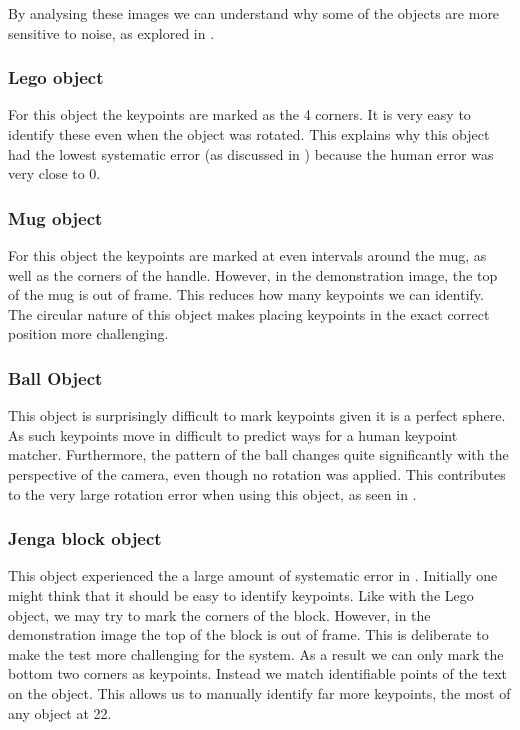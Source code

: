 By analysing these images we can understand why some of the objects are more sensitive to noise, as explored in .

\subsubsection{Lego object}
For this object the keypoints are marked as the 4 corners. It is very easy to identify these even when the object was rotated. This explains why this object had the lowest systematic error (as discussed in ) because the human error was very close to 0.

\subsubsection{Mug object}
For this object the keypoints are marked at even intervals around the mug, as well as the corners of the handle. However, in the demonstration image, the top of the mug is out of frame. This reduces how many keypoints we can identify. The circular nature of this object makes placing keypoints in the exact correct position more challenging.

\subsubsection{Ball Object}
This object is surprisingly difficult to mark keypoints given it is a perfect sphere. As such keypoints move in difficult to predict ways for a human keypoint matcher. Furthermore, the pattern of the ball changes quite significantly with the perspective of the camera, even though no rotation was applied. This contributes to the very large rotation error when using this object, as seen in .

\subsubsection{Jenga block object}
This object experienced the a large amount of systematic error in . Initially one might think that it should be easy to identify keypoints. Like with the Lego object, we may try to mark the corners of the block. However, in the demonstration image the top of the block is out of frame. This is deliberate to make the test more challenging for the system. As a result we can only mark the bottom two corners as keypoints. Instead we match identifiable points of the text on the object. This allows us to manually identify far more keypoints, the most of any object at 22.

